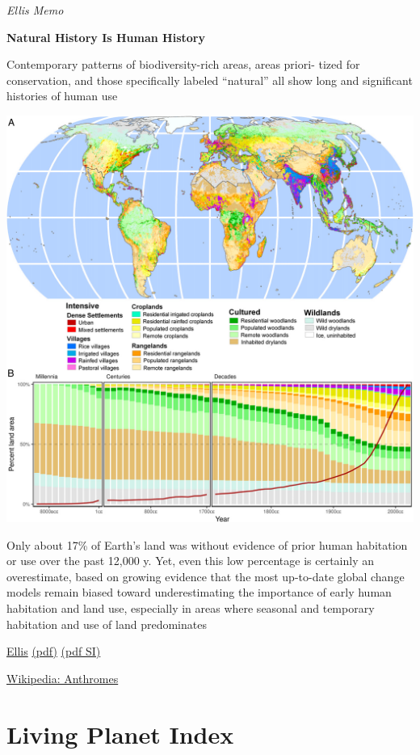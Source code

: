 \documentclass[
]{book}
\begin{document}
\emph{Ellis Memo}

\textbf{Natural History Is Human History}

Contemporary patterns of biodiversity-rich areas, areas priori-
tized for conservation, and those specifically labeled ``natural'' all
show long and significant histories of human use

\includegraphics{fig/anthromes.png}

Only about 17\% of Earth's land was without
evidence of prior human habitation or use over the past 12,000 y.
Yet, even this low percentage is certainly an overestimate, based
on growing evidence that the most up-to-date global change models
remain biased toward underestimating the importance of early
human habitation and land use, especially in areas where seasonal
and temporary habitation and use of land predominates

\href{https://www.pnas.org/content/118/17/e2023483118}{Ellis}
\href{pdf/Ellis_2021_Degradation_Loss.pdf}{(pdf)}
\href{Ellis_2021_Degradation_Loss_SI.pdf}{(pdf SI)}

\href{https://en.wikipedia.org/wiki/Anthropogenic_biome}{Wikipedia: Anthromes}

\hypertarget{living-planet-index}{%
\section{Living Planet Index}\label{living-planet-index}}
\end{document}
